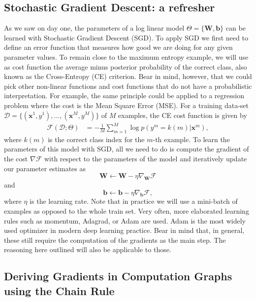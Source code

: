 \subsection{Stochastic Gradient Descent: a refresher}

As we saw on day one, the parameters of a log linear model
$\Theta=\{\mathbf{W}, \mathbf{b}\}$ can be learned with Stochastic Gradient
Descent (SGD). To apply SGD we first need to define an error function that
measures how good we are doing for any given parameter values. To remain close
to the maximum entropy example, we will use as cost function the average minus
posterior probability of the correct class, also known as the Cross-Entropy
(CE) criterion. Bear in mind, however, that we could pick other non-linear
functions and cost functions that do not have a probabilistic interpretation.
For example, the same principle could be applied to a regression problem where
the cost is the Mean Square Error (MSE).  For a training data-set $\mathcal{D}
= \{(\mathbf{x}^1,y^1), \ldots, (\mathbf{x}^M,y^M)\}$ of $M$ examples, the CE
cost function is given by
%
\begin{align}
\mathcal{F}(\mathcal{D};\Theta)
& = -\frac{1}{M}\sum_{m=1}^{M} \log p(y^m=k(m) | \mathbf{x}^m),
\label{eq:CostLogPos}
\end{align}
%
where $k(m)$ is the correct class index for the $m$-th example.
To learn the parameters of this model with SGD, all we need to do is compute the gradient
of the cost $\nabla\mathcal{F}$ with respect to the parameters of the model and
iteratively update our  parameter estimates as
%
\begin{equation}
\mathbf{W} \leftarrow \mathbf{W} - \eta \nabla_\mathbf{W}\mathcal{F}
\end{equation}
and
\begin{equation}
\mathbf{b} \leftarrow \mathbf{b} - \eta \nabla_\mathbf{b}\mathcal{F},
\end{equation}
%
\noindent where $\eta$ is the learning rate. Note that in practice we will use
a mini-batch of examples as opposed to the whole train set. Very often, more
elaborated learning rules such as momentum, Adagrad, or Adam \citep{kingma2014adam} are used. Adam is the most widely used optimizer in modern deep learning practice. Bear in mind
that, in general, these still require the computation of the gradients as the
main step. The reasoning here outlined will also be applicable to those.

\subsection{Deriving Gradients in Computation Graphs using the Chain Rule}

